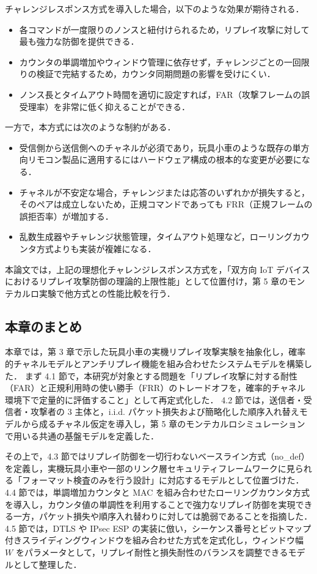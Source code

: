 \documentclass[twocolumn,10pt,a4paper]{jsarticle}
\begin{document}
チャレンジレスポンス方式を導入した場合，以下のような効果が期待される．

\begin{itemize}
  \item 各コマンドが一度限りのノンスと紐付けられるため，リプレイ攻撃に対して最も強力な防御を提供できる．
  \item カウンタの単調増加やウィンドウ管理に依存せず，チャレンジごとの一回限りの検証で完結するため，カウンタ同期問題の影響を受けにくい．
  \item ノンス長とタイムアウト時間を適切に設定すれば，FAR（攻撃フレームの誤受理率）を非常に低く抑えることができる．
\end{itemize}

一方で，本方式には次のような制約がある．

\begin{itemize}
  \item 受信側から送信側へのチャネルが必須であり，玩具小車のような既存の単方向リモコン製品に適用するにはハードウェア構成の根本的な変更が必要になる．
  \item チャネルが不安定な場合，チャレンジまたは応答のいずれかが損失すると，そのペアは成立しないため，正規コマンドであっても FRR（正規フレームの誤拒否率）が増加する．
  \item 乱数生成器やチャレンジ状態管理，タイムアウト処理など，ローリングカウンタ方式よりも実装が複雑になる．
\end{itemize}

本論文では，上記の理想化チャレンジレスポンス方式を，「双方向 IoT デバイスにおけるリプレイ攻撃防御の理論的上限性能」として位置付け，第 5 章のモンテカルロ実験で他方式との性能比較を行う．

\subsection{本章のまとめ}

本章では，第 3 章で示した玩具小車の実機リプレイ攻撃実験を抽象化し，確率的チャネルモデルとアンチリプレイ機能を組み合わせたシステムモデルを構築した．
まず 4.1 節で，本研究が対象とする問題を「リプレイ攻撃に対する耐性（FAR）と正規利用時の使い勝手（FRR）のトレードオフを，確率的チャネル環境下で定量的に評価すること」として再定式化した．
4.2 節では，送信者・受信者・攻撃者の 3 主体と，i.i.d. パケット損失および簡略化した順序入れ替えモデルから成るチャネル仮定を導入し，第 5 章のモンテカルロシミュレーションで用いる共通の基盤モデルを定義した．

その上で，4.3 節ではリプレイ防御を一切行わないベースライン方式（no\_def）を定義し，実機玩具小車や一部のリンク層セキュリティフレームワークに見られる「フォーマット検査のみを行う設計」に対応するモデルとして位置づけた．
4.4 節では，単調増加カウンタと MAC を組み合わせたローリングカウンタ方式を導入し，カウンタ値の単調性を利用することで強力なリプレイ防御を実現できる一方，パケット損失や順序入れ替わりに対しては脆弱であることを指摘した．
4.5 節では，DTLS や IPsec ESP の実装に倣い，シーケンス番号とビットマップ付きスライディングウィンドウを組み合わせた方式を定式化し，ウィンドウ幅 $W$ をパラメータとして，リプレイ耐性と損失耐性のバランスを調整できるモデルとして整理した．
\end{document}
